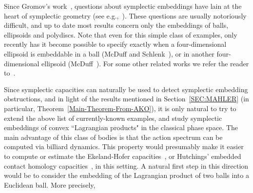 \documentclass{icmart}
\theoremstyle{definition}
\begin{document}
Since Gromov's work~\cite{Gr}, questions about symplectic embeddings have lain at the heart
of symplectic geometry (see e.g.,~\cite{B1,B3,Gu,Hu2, LMS, Mcd2,McPol,McSch, Schl1,Schle}). %
  These questions are usually notoriously difficult, and up to date most results concern  only the embeddings of balls, ellipsoids and polydiscs. 
Note that even for this simple class of examples, only 
recently  has it  become possible to specify exactly when a four-dimensional ellipsoid is embeddable in a ball (McDuff and Schlenk~\cite{McSch}), or in another four-dimensional ellipsoid (McDuff~\cite{Mcd2}).
For some other related works we refer the reader to~\cite{BH,CCFHR,CGK,FM, HK,HL,Op1}.
\smallskip

Since symplectic capacities can naturally be used to detect symplectic embedding obstructions, and in light of the results mentioned in Section~\ref{SEC:MAHLER} (in particular, Theorem~\ref{Main-Theorem-From-AKO}), 
it is only natural to try to extend the above list of currently-known examples, and study symplectic embeddings of convex ``Lagrangian products" in 
the classical phase space. The main advantage of this class of bodies is that the action spectrum can be computed via billiard dynamics. This 
property would presumably make it easier to compute or estimate the Ekeland-Hofer capacities~\cite{EH}, 
or Hutchings' embedded contact homology capacities~\cite{Hu1,Hu2}, in this setting. 
A natural first step in this direction would be to consider the embedding of the Lagrangian product of two balls into a Euclidean ball.
More precisely, 
%
%
%
%
%
\end{document}
